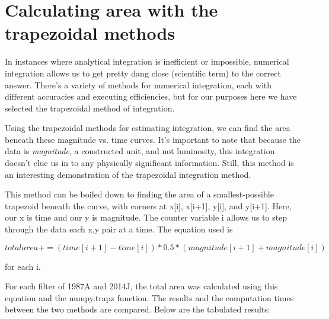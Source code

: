 \section{Calculating area with the trapezoidal methods}

In instances where analytical integration is inefficient or impossible, numerical integration allows us to get pretty dang close (scientific term) to the correct answer. There's a variety of methods for numerical integration, each with different accuracies and executing efficiencies, but for our purposes here we have selected the trapezoidal method of integration. 

Using the trapezoidal methods for estimating integration, we can find the area beneath these magnitude vs. time curves. It's important to note that because the data is \textit{magnitude}, a constructed unit, and not luminosity, this integration doesn't clue us in to any physically significant information. Still, this method is an interesting demonstration of the trapezoidal integration method.

This method can be boiled down to finding the area of a smallest-possible trapezoid beneath the curve, with corners at x[i], x[i+1], y[i], and y[i+1]. Here, our x is time and our y is magnitude. The counter variable i allows us to step through the data each x,y pair at a time. The equation used is 

\begin{equation}
	\label{fit_eq}
	total area += (time[i+1] - time[i])*0.5*(magnitude[i+1]+magnitude[i])
\end{equation}

for each i.

For each filter of 1987A and 2014J, the total area was calculated using this equation and the numpy.trapz function. The results and the computation times between the two methods are compared. Below are the tabulated results:

